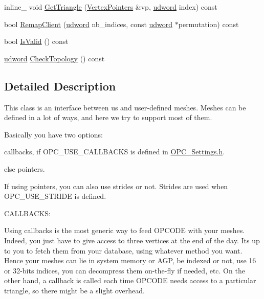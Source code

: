 \begin{DoxyCompactItemize}
\item 
inline\+\_\+ void \hyperlink{classMeshInterface_ae2ce7bb92b4a2825147c33616114f2c1}{Get\+Triangle} (\hyperlink{structVertexPointers}{Vertex\+Pointers} \&vp, \hyperlink{IceTypes_8h_a44c6f1920ba5551225fb534f9d1a1733}{udword} index) const 
\item 
bool \hyperlink{classMeshInterface_a7507e521cb4cd844960dd5e24eba937a}{Remap\+Client} (\hyperlink{IceTypes_8h_a44c6f1920ba5551225fb534f9d1a1733}{udword} nb\+\_\+indices, const \hyperlink{IceTypes_8h_a44c6f1920ba5551225fb534f9d1a1733}{udword} $\ast$permutation) const 
\item 
bool \hyperlink{classMeshInterface_a28e02f1fa9f6d41523fae3f8649fcdb5}{Is\+Valid} () const 
\item 
\hyperlink{IceTypes_8h_a44c6f1920ba5551225fb534f9d1a1733}{udword} \hyperlink{classMeshInterface_a27f3838ddf40b99457039bf161fc2aa7}{Check\+Topology} () const 
\end{DoxyCompactItemize}


\subsection{Detailed Description}
This class is an interface between us and user-\/defined meshes. Meshes can be defined in a lot of ways, and here we try to support most of them.

Basically you have two options\+:
\begin{DoxyItemize}
\item callbacks, if O\+P\+C\+\_\+\+U\+S\+E\+\_\+\+C\+A\+L\+L\+B\+A\+C\+KS is defined in \hyperlink{OPC__Settings_8h}{O\+P\+C\+\_\+\+Settings.\+h}.
\item else pointers.
\end{DoxyItemize}

If using pointers, you can also use strides or not. Strides are used when O\+P\+C\+\_\+\+U\+S\+E\+\_\+\+S\+T\+R\+I\+DE is defined.

C\+A\+L\+L\+B\+A\+C\+KS\+:

Using callbacks is the most generic way to feed O\+P\+C\+O\+DE with your meshes. Indeed, you just have to give access to three vertices at the end of the day. It\textquotesingle{}s up to you to fetch them from your database, using whatever method you want. Hence your meshes can lie in system memory or A\+GP, be indexed or not, use 16 or 32-\/bits indices, you can decompress them on-\/the-\/fly if needed, etc. On the other hand, a callback is called each time O\+P\+C\+O\+DE needs access to a particular triangle, so there might be a slight overhead.

